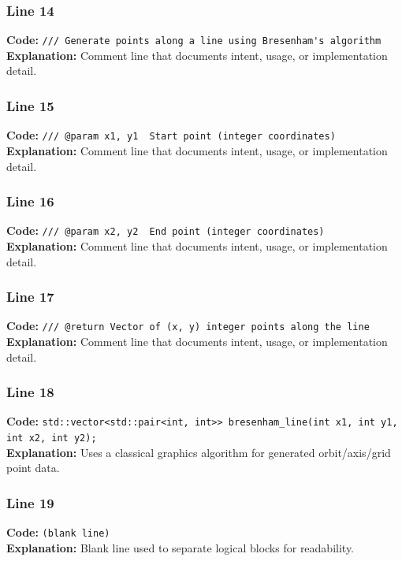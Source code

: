 \documentclass[11pt,a4paper]{article}
\begin{document}
\subsubsection*{Line 14}
\textbf{Code:} \verb|/// Generate points along a line using Bresenham's algorithm|\\
\textbf{Explanation:} Comment line that documents intent, usage, or implementation detail.

\subsubsection*{Line 15}
\textbf{Code:} \verb|/// @param x1, y1  Start point (integer coordinates)|\\
\textbf{Explanation:} Comment line that documents intent, usage, or implementation detail.

\subsubsection*{Line 16}
\textbf{Code:} \verb|/// @param x2, y2  End point (integer coordinates)|\\
\textbf{Explanation:} Comment line that documents intent, usage, or implementation detail.

\subsubsection*{Line 17}
\textbf{Code:} \verb|/// @return Vector of (x, y) integer points along the line|\\
\textbf{Explanation:} Comment line that documents intent, usage, or implementation detail.

\subsubsection*{Line 18}
\textbf{Code:} \verb|std::vector<std::pair<int, int>> bresenham_line(int x1, int y1, int x2, int y2);|\\
\textbf{Explanation:} Uses a classical graphics algorithm for generated orbit/axis/grid point data.

\subsubsection*{Line 19}
\textbf{Code:} \texttt{(blank line)}\\
\textbf{Explanation:} Blank line used to separate logical blocks for readability.
\end{document}
